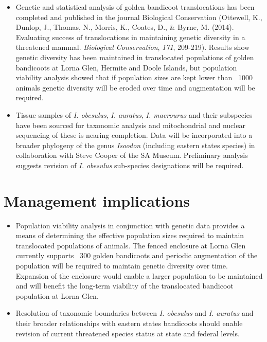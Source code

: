 \documentclass[version=last, paper=a4, DIV=18, usenames, dvipsnames]{scrartcl}
\begin{document}
\begin{itemize}

  \item Genetic and statistical analysis of golden bandicoot translocations has been completed and published in the journal Biological Conservation (Ottewell, K., Dunlop, J., Thomas, N., Morris, K., Coates, D., \& Byrne, M. (2014). Evaluating success of translocations in maintaining genetic diversity in a threatened mammal. \emph{Biological Conservation}, \emph{171}, 209-219). Results show genetic diversity has been maintained in translocated populations of golden bandicoots at Lorna Glen, Hermite and Doole Islands, but population viability analysis showed that if population sizes are kept lower than ~1000 animals genetic diversity will be eroded over time and augmentation will be required.

  \item Tissue samples of \emph{I. obesulus}, \emph{I. auratus}, \emph{I. macrourus} and their subspecies have been sourced for taxonomic analysis and mitochondrial and nuclear sequencing of these is nearing completion. Data will be incorporated into a broader phylogeny of the genus \emph{Isoodon} (including eastern states species) in collaboration with Steve Cooper of the SA Museum. Preliminary analysis suggests revision of \emph{I. obesulus} sub-species designations will be required.

\end{itemize}






\section{Management implications}



\begin{itemize}

  \item Population viability analysis in conjunction with genetic data provides a means of determining the effective population sizes required to maintain translocated populations of animals. The fenced enclosure at Lorna Glen currently supports ~300 golden bandicoots and periodic augmentation of the population will be required to maintain genetic diversity over time. Expansion of the enclosure would enable a larger population to be maintained and will benefit the long-term viability of the translocated bandicoot population at Lorna Glen.

  \item Resolution of taxonomic boundaries between \emph{I. obesulus} and \emph{I. auratus} and their broader relationships with eastern states bandicoots should enable revision of current threatened species status at state and federal levels.

\end{itemize}
\end{document}
